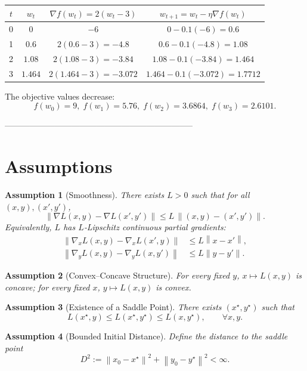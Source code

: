 \documentclass{article}
\newtheorem{assumption}{Assumption}
\newcommand{\norm}[1]{\left\lVert#1\right\rVert}
\begin{document}
\begin{center}
\begin{tabular}{c|c|c|c}
$t$ & $w_t$ & $\nabla f(w_t)=2(w_t-3)$ & $w_{t+1}=w_t-\eta\nabla f(w_t)$\\ \hline
0 & $0$ & $-6$ & $0-0.1(-6)=0.6$ \\
1 & $0.6$ & $2(0.6-3)=-4.8$ & $0.6-0.1(-4.8)=1.08$ \\
2 & $1.08$ & $2(1.08-3)=-3.84$ & $1.08-0.1(-3.84)=1.464$ \\
3 & $1.464$ & $2(1.464-3)=-3.072$ & $1.464-0.1(-3.072)=1.7712$
\end{tabular}
\end{center}
The objective values decrease:
\[
f(w_0)=9,\; f(w_1)=5.76,\; f(w_2)=3.6864,\; f(w_3)=2.6101.
\]

--------------------------------------------------------------------
\section*{Assumptions}
\begin{assumption}[Smoothness]\label{ass:smooth}
There exists $L>0$ such that for all $(x,y),(x',y')$,
\[
\norm{\nabla L(x,y)-\nabla L(x',y')}\le L\,\norm{(x,y)-(x',y')}.
\]
Equivalently, $L$ has $L$‑Lipschitz continuous partial gradients:
\[
\begin{aligned}
\norm{\nabla_x L(x,y)-\nabla_x L(x',y)} &\le L \norm{x-x'},\\
\norm{\nabla_y L(x,y)-\nabla_y L(x,y')} &\le L \norm{y-y'}.
\end{aligned}
\]
\end{assumption}

\begin{assumption}[Convex–Concave Structure]\label{ass:cc}
For every fixed $y$, $x\mapsto L(x,y)$ is concave;  
for every fixed $x$, $y\mapsto L(x,y)$ is convex.
\end{assumption}

\begin{assumption}[Existence of a Saddle Point]\label{ass:saddle}
There exists $(x^\star,y^\star)$ such that
\[
L(x^\star,y)\le L(x^\star,y^\star)\le L(x,y^\star),\qquad\forall x,y.
\]
\end{assumption}

\begin{assumption}[Bounded Initial Distance]\label{ass:bound}
Define the distance to the saddle point
\[
D^2:=\norm{x_0-x^\star}^2+\norm{y_0-y^\star}^2<\infty .
\]
\end{assumption}
\end{document}
